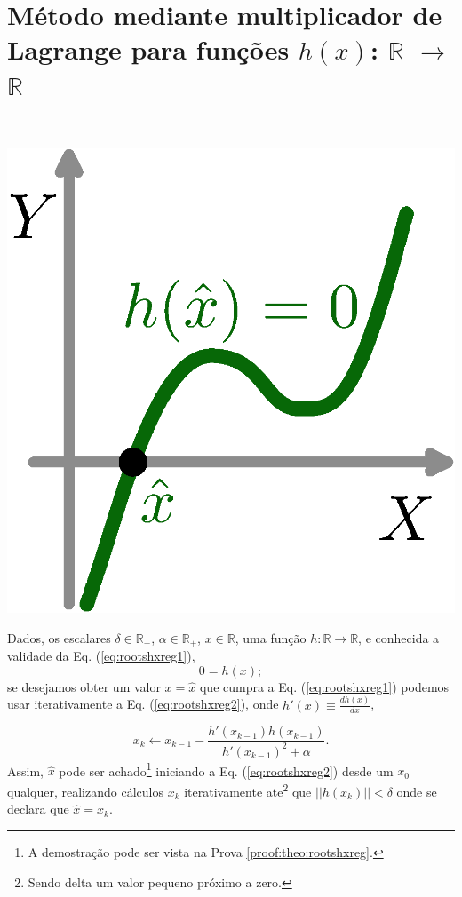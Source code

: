 
\section{ Método mediante multiplicador de Lagrange para funções $h(x)$: $\mathbb{R}$ $\rightarrow$ $\mathbb{R}$ }

\begin{theorem}\label{theo:rootshxreg}
~\\
\begin{minipage}{0.2\textwidth}
\centering
\includegraphics[width=0.90\linewidth]{chapters/roots/roots1.eps} 
\end{minipage}
\begin{minipage}{0.8\textwidth}
Dados,
os escalares $\delta \in \mathbb{R}_+$, 
$\alpha \in \mathbb{R}_+$, 
$x \in \mathbb{R}$, 
uma função $h:\mathbb{R} \rightarrow \mathbb{R}$, e 
conhecida a validade da Eq. (\ref{eq:rootshxreg1}),
\begin{equation}\label{eq:rootshxreg1}
0=h(x);
\end{equation}
se desejamos obter um valor $x=\hat{x}$ que cumpra a Eq. (\ref{eq:rootshxreg1})
podemos usar iterativamente a Eq. (\ref{eq:rootshxreg2}),
onde  $h'(x)\equiv \frac{d h(x)}{d x}$,
\end{minipage}

\begin{equation}\label{eq:rootshxreg2}
x_{k} \leftarrow x_{k-1}-\frac{ h'(x_{k-1})h(x_{k-1})}{h'(x_{k-1})^2+\alpha}.
\end{equation}
Assim, $\hat{x}$ pode ser achado\footnote{A 
demostração pode ser vista na Prova \ref{proof:theo:rootshxreg}.} 
iniciando a Eq. (\ref{eq:rootshxreg2}) desde um 
$x_{0}$ qualquer, realizando cálculos $x_{k}$ iterativamente  
ate\footnote{Sendo delta um valor pequeno próximo a zero.} que $||h(x_k)||<\delta$
onde se declara que $\hat{x}=x_k$.


\end{theorem}
